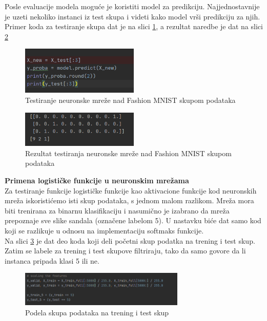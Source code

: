 \documentclass[a4paper,12pt]{report}
\begin{document}
Posle evaluacije modela moguće je koristiti model za predikciju. Najjednostavnije je uzeti nekoliko instanci iz test skupa i videti kako model vrši predikciju za njih. Primer koda za testiranje skupa dat je na slici \ref{fig:fashion_mnist_test}, a rezultat naredbe je dat na slici \ref{fig:fashion_mnist_test_result}\\

\begin{figure}[h]
    \centering
    \includegraphics[width=0.5\textwidth]{fashion_mnist_test.png}
    \caption{Testiranje neuronske mreže nad Fashion MNIST skupom podataka}\label{fig:fashion_mnist_test}
\end{figure}

\begin{figure}[h]
    \centering
    \includegraphics[width=0.5\textwidth]{fashion_mnist_test_result.png}
    \caption{Rezultat testiranja neuronske mreže nad Fashion MNIST skupom podataka}\label{fig:fashion_mnist_test_result}
\end{figure}

\textbf{Primena logističke funkcije u neuronskim mrežama}\\

Za testiranje funkcije logističke funkcije kao aktivacione funkcije kod neuronskih mreža iskoristićemo isti skup podataka, s jednom malom razlikom. Mreža mora biti trenirana za binarnu klasifikaciju i nasumično je izabrano da mreža prepoznaje sve slike sandala (označene labelom 5). U nastavku biće dat samo kod koji se razlikuje u odnosu na implementaciju softmaks funkcije. \\

Na slici \ref{fig:filter_mnist} je dat deo koda koji deli početni skup podatka na trening i test skup. Zatim se labele za trening i test skupove filtriraju, tako da samo govore da li instanca pripada klasi 5 ili ne.\\

\begin{figure}[h]
    \centering
    \includegraphics[width=0.7\textwidth]{filter_mnist.png}
    \caption{Podela skupa podataka na trening i test skup}\label{fig:filter_mnist}
\end{figure}
\end{document}

